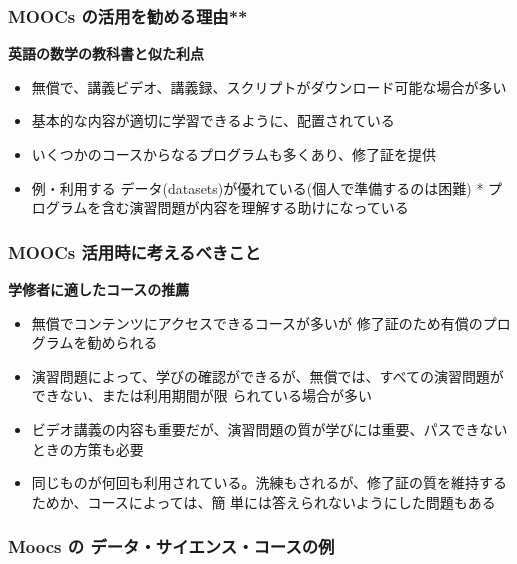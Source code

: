 \documentclass[
]{book}
\providecommand{\tightlist}{%
  \setlength{\itemsep}{0pt}\setlength{\parskip}{0pt}}
\theoremstyle{definition}
\theoremstyle{definition}
\theoremstyle{definition}
\theoremstyle{definition}
\theoremstyle{remark}
\begin{document}
\hypertarget{moocs-ux306eux6d3bux7528ux3092ux52e7ux3081ux308bux7406ux7531}{%
\subsubsection{MOOCs の活用を勧める理由**}\label{moocs-ux306eux6d3bux7528ux3092ux52e7ux3081ux308bux7406ux7531}}

\textbf{英語の数学の教科書と似た利点}

\begin{itemize}
\tightlist
\item
  無償で、講義ビデオ、講義録、スクリプトがダウンロード可能な場合が多い
\item
  基本的な内容が適切に学習できるように、配置されている
\item
  いくつかのコースからなるプログラムも多くあり、修了証を提供
\item
  例・利用する データ(datasets)が優れている(個人で準備するのは困難) * プログラムを含む演習問題が内容を理解する助けになっている
\end{itemize}

\hypertarget{moocs-ux6d3bux7528ux6642ux306bux8003ux3048ux308bux3079ux304dux3053ux3068}{%
\subsubsection{MOOCs 活用時に考えるべきこと}\label{moocs-ux6d3bux7528ux6642ux306bux8003ux3048ux308bux3079ux304dux3053ux3068}}

\textbf{学修者に適したコースの推薦}

\begin{itemize}
\tightlist
\item
  無償でコンテンツにアクセスできるコースが多いが 修了証のため有償のプログラムを勧められる
\item
  演習問題によって、学びの確認ができるが、無償では、すべての演習問題ができない、または利用期間が限
  られている場合が多い
\item
  ビデオ講義の内容も重要だが、演習問題の質が学びには重要、パスできないときの方策も必要
\item
  同じものが何回も利用されている。洗練もされるが、修了証の質を維持するためか、コースによっては、簡 単には答えられないようにした問題もある
\end{itemize}

\hypertarget{moocs-ux306e-ux30c7ux30fcux30bfux30b5ux30a4ux30a8ux30f3ux30b9ux30b3ux30fcux30b9ux306eux4f8b}{%
\subsubsection{Moocs の データ・サイエンス・コースの例}\label{moocs-ux306e-ux30c7ux30fcux30bfux30b5ux30a4ux30a8ux30f3ux30b9ux30b3ux30fcux30b9ux306eux4f8b}}
\end{document}
